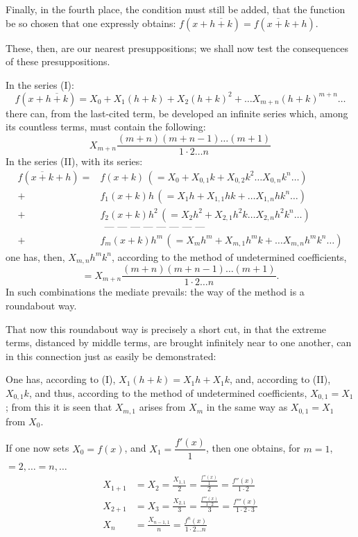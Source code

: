 \documentclass[12pt]{book}
\begin{document}
Finally, in the fourth place, the condition must still be added, that the function be
so chosen that one expressly obtains:
$f(x + \overline{h+k}) = f(\overline{x+k} + h)$.

These, then, are our nearest presuppositions; we shall now test the consequences of
these presuppositions.

In the series (I):
\[
f(x + \overline{h+k}) = X_0 + X_1(h+k) + X_2(h+k)^{2} + \dots
X_{m+n}(h+k)^{m+n}\dots
\]
there can, from the last-cited term, be developed an
infinite series which, among its countless terms, must contain the following:
\[
X_{m+n}\frac{(m+n)(m+n-1)\dots(m+1)}{1\cdot 2\dots n}
\]
In the series (II), with its series:
\[
\begin{aligned}
f(\overline{x+k}+h) = {}& f(x+k)\,(= X_0 + X_{0,1}k + X_{0,2}k^{2}\dots
X_{0,n}k^{n}\dots)\\
+{}& f_1(x+k)h\,(= X_1 h + X_{1,1}hk + \dots X_{1,n}hk^{n}\dots)\\
+{}& f_2(x+k)h^{2}\,(= X_2 h^{2} + X_{2,1}h^{2}k \dots X_{2,n}h^{2}k^{n}\dots)\\
&\ \ \text{--- --- --- --- --- --- --- ---}\\
+{}& f_m(x+k)h^{m}\,(= X_m h^{m} + X_{m,1}h^{m}k + \dots X_{m,n}h^{m}k^{n}\dots)
\end{aligned}
\]
one has, then, $X_{m,n}h^{m}k^{n}$, according to the method of undetermined
coefficients,
\[
= X_{m+n}\frac{(m+n)(m+n-1)\dots(m+1)}{1\cdot 2\dots n}.
\]
In such combinations the mediate prevails: the way of the method is a roundabout way.

That now this roundabout way is precisely a short cut, in that the extreme terms,
distanced by middle terms, are brought infinitely near to one another, can in this
connection just as easily be demonstrated:

One has, according to (I), $X_1(h+k) = X_1 h + X_1 k$, and, according to (II),
$X_{0,1}k$, and thus, according to the method of undetermined coefficients,
$X_{0,1} = X_1$; from this it is seen that $X_{m,1}$ arises from $X_m$ in the same way
as $X_{0,1} = X_1$ from $X_0$.

If one now sets $X_0 = f(x)$, and $X_1 = \dfrac{f'(x)}{1}$, then one obtains, for
$m = 1$, $= 2, \dots = n, \dots$
\begin{align*}
X_{1+1} &= X_2 = \frac{X_{1,1}}{2} = \frac{\frac{f''(x)}{1}}{2}
= \frac{f''(x)}{1\cdot 2}\\
X_{2+1} &= X_3 = \frac{X_{2,1}}{3} = \frac{\frac{f'''(x)}{1\cdot 2}}{3}
= \frac{f'''(x)}{1\cdot 2\cdot 3}\\
X_n &= \frac{X_{n-1,1}}{n} = \frac{f^{n}(x)}{1\cdot 2\dots n}
\end{align*}
\end{document}
